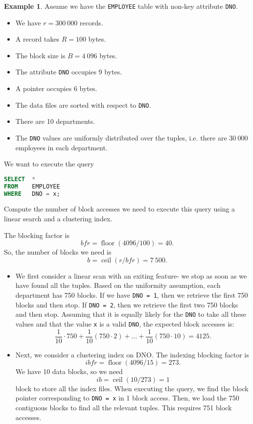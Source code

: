 \documentclass[a4paper, openany]{memoir}
\theoremstyle{definition}
\newtheorem{example}[subsection]{Example}
\begin{document}
\begin{example}
    Assume we have the \texttt{EMPLOYEE} table with non-key attribute \texttt{DNO}.
    \begin{itemize}
        \item We have $r = 300 \ 000$ records.
        \item A record takes $R = 100$ bytes.
        \item The block size is $B = 4 \ 096$ bytes.
        \item The attribute \texttt{DNO} occupies 9 bytes.
        \item A pointer occupies 6 bytes.
        \item The data files are sorted with respect to \texttt{DNO}.
        \item There are 10 departments.
        \item The \texttt{DNO} values are uniformly distributed over the tuples, i.e. there are $30 \ 000$ employees in each department.
    \end{itemize}
    We want to execute the query
\begin{lstlisting}[language=SQL]
SELECT  *
FROM    EMPLOYEE
WHERE   DNO = x;
\end{lstlisting}
    Compute the number of block accesses we need to execute this query using a linear search and a clustering index.
\end{example}
\begin{answer}
    The blocking factor is
    \[\textit{bfr} = \operatorname{floor}(4096/100) = 40.\]    
    So, the number of blocks we need is
    \[b = \operatorname{ceil}(r/\textit{bfr}) = 7 \ 500.\]
    
    \begin{itemize}
        \item We first consider a linear scan with an exiting feature- we stop as soon as we have found all the tuples. Based on the uniformity assumption, each department has 750 blocks. If we have \texttt{DNO = 1}, then we retrieve the first 750 blocks and then stop. If \texttt{DNO = 2}, then we retrieve the first two 750 blocks and then stop. Assuming that it is equally likely for the \texttt{DNO} to take all these values and that the value \texttt{x} is a valid \texttt{DNO}, the expected block accesses is:
        \[\frac{1}{10} \cdot 750 + \frac{1}{10} (750 \cdot 2) + \dots + \frac{1}{10} (750 \cdot 10) = 4125.\]    
        
        \item Next, we consider a clustering index on DNO. The indexing blocking factor is
        \[\textit{ibfr} = \operatorname{floor}(4096/15) = 273.\]
        We have 10 data blocks, so we need
        \[\textit{ib} = \operatorname{ceil}(10/273) = 1\]
        block to store all the index files. When executing the query, we find the block pointer corresponding to \texttt{DNO = x} in 1 block access. Then, we load the 750 contiguous blocks to find all the relevant tuples. This requires 751 block accesses.
    \end{itemize}
\end{answer}
\end{document}

